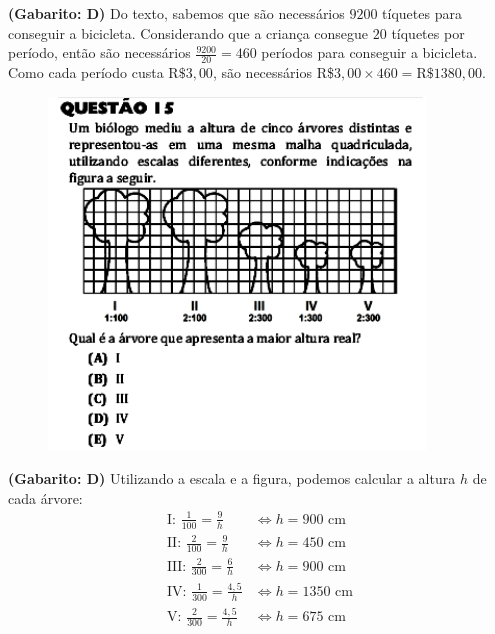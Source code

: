 \documentclass[a4paper]{article}
\begin{document}
\par\textbf{(Gabarito: D)} Do texto, sabemos que são necessários $9200$ tíquetes para conseguir a bicicleta. Considerando que a criança consegue $20$ tíquetes por período, então são necessários $\displaystyle{ \frac{9200}{20} = 460 }$ períodos para conseguir a bicicleta. Como cada período custa $\text{R\$}3,00$, são necessários R\$$3,00\times 460 = \text{R\$}1380,00$.
\begin{figure}[H]
	\begin{center}
		\includegraphics[width=10cm]{L2Q15.png}
	\end{center}
\end{figure}
\par\textbf{(Gabarito: D)} Utilizando a escala e a figura, podemos calcular a altura $h$ de cada árvore:
\begin{align*}
\text{I: } \frac{1}{100} = \frac{9}{h} &\iff h = 900\text{ cm} \\
\text{II: } \frac{2}{100} = \frac{9}{h} &\iff h = 450\text{ cm} \\
\text{III: } \frac{2}{300} = \frac{6}{h} &\iff h = 900\text{ cm} \\
\text{IV: } \frac{1}{300} = \frac{4,5}{h} &\iff h = 1350\text{ cm} \\
\text{V: } \frac{2}{300} = \frac{4,5}{h} &\iff h = 675\text{ cm} 
\end{align*}
\end{document}
